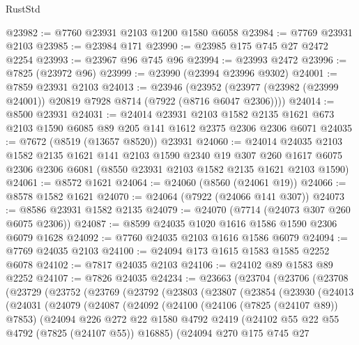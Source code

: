 \begin{lexlean}{RustStd}
\begin{coremodule}
@23982 := @7760 @23931 @2103 @1200 @1580 @6058
@23984 := @7769 @23931 @2103
@23985 := @23984 @171
@23990 := @23985 @175 @745 @27 @2472 @2254
@23993 := @23967 @96 @745 @96
@23994 := @23993 @2472
@23996 := @7825 (@23972 @96)
@23999 := @23990 (@23994 @23996 @9302)
@24001 := @7859 @23931 @2103
@24013 := @23946
    (@23952 (@23977 (@23982 (@23999 @24001)) @20819 @7928 @8714 (@7922 (@8716 @6047 @2306))))
@24014 := @8500 @23931
@24031 := @24014
    @23931
    @2103
    @1582
    @2135
    @1621
    @673
    @2103
    @1590
    @6085
    @89
    @205
    @141
    @1612
    @2375
    @2306
    @2306
    @6071
@24035 := @7672 (@8519 (@13657 @8520)) @23931
@24060 := @24014
    @24035
    @2103
    @1582
    @2135
    @1621
    @141
    @2103
    @1590
    @2340
    @19
    @307
    @260
    @1617
    @6075
    @2306
    @2306
    @6081
    (@8550 @23931 @2103 @1582 @2135 @1621 @2103 @1590)
@24061 := @8572 @1621
@24064 := @24060 (@8560 (@24061 @19))
@24066 := @8578 @1582 @1621
@24070 := @24064 (@7922 (@24066 @141 @307))
@24073 := @8586 @23931 @1582 @2135
@24079 := @24070 (@7714 (@24073 @307 @260 @6075 @2306))
@24087 := @8599 @24035 @1020 @1616 @1586 @1590 @2306 @6079 @1628
@24092 := @7760 @24035 @2103 @1616 @1586 @6079
@24094 := @7769 @24035 @2103
@24100 := @24094 @173 @1615 @1583 @1585 @2252 @6078
@24102 := @7817 @24035 @2103
@24106 := @24102 @89 @1583 @89 @2252
@24107 := @7826 @24035
@24234 := @23663
    (@23704
      (@23706
        (@23708
          (@23729
            (@23752
              (@23769
                (@23792
                  (@23803
                    (@23807
                      (@23854
                        (@23930
                          (@24013
                            (@24031
                              (@24079
                                (@24087
                                  (@24092
                                    (@24100
                                      (@24106 (@7825 (@24107 @89)) @7853)
                                      (@24094
                                        @226
                                        @272
                                        @22
                                        @1580
                                        @4792
                                        @2419
                                        (@24102 @55 @22 @55 @4792 (@7825 (@24107 @55)) @16885)
                                        (@24094
                                          @270
                                          @175
                                          @745
                                          @27

\end{coremodule}
\end{lexlean}
